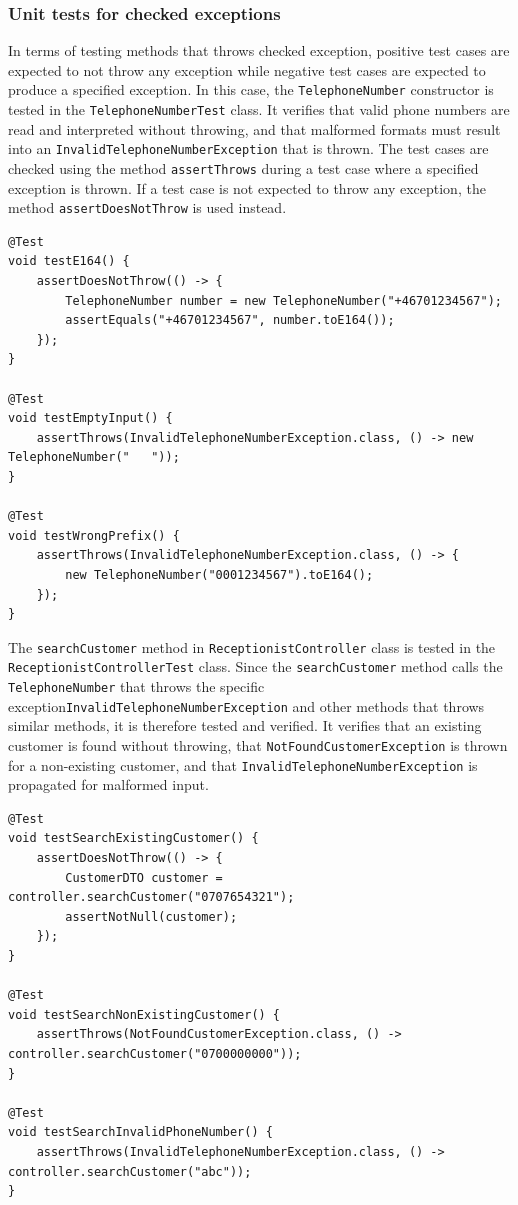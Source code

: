 \documentclass[a4paper]{scrartcl}
\begin{document}
\subsubsection{Unit tests for checked exceptions}

In terms of testing methods that throws checked exception, positive test cases are expected to not throw any exception while negative test cases are expected to produce a specified exception. In this case, the \texttt{TelephoneNumber} constructor is tested in the \texttt{TelephoneNumberTest} class. It verifies that valid phone numbers are read and interpreted without throwing, and that malformed formats must result into an \texttt{InvalidTelephoneNumberException} that is thrown. The test cases are checked using the method \texttt{assertThrows} during a test case where a specified exception is thrown. If a test case is not expected to throw any exception, the method \texttt{assertDoesNotThrow} is used instead.

\begin{lstlisting}[style=javastyle, caption={TelephoneNumberTest - testing TelephoneNumber constructor}]
@Test
void testE164() {
    assertDoesNotThrow(() -> {
        TelephoneNumber number = new TelephoneNumber("+46701234567");
        assertEquals("+46701234567", number.toE164());
    });
}

@Test
void testEmptyInput() {
    assertThrows(InvalidTelephoneNumberException.class, () -> new TelephoneNumber("   "));
}

@Test
void testWrongPrefix() {
    assertThrows(InvalidTelephoneNumberException.class, () -> {
        new TelephoneNumber("0001234567").toE164();
    });
}
\end{lstlisting}

The \texttt{searchCustomer} method in \texttt{ReceptionistController} class is tested in the \linebreak\texttt{ReceptionistControllerTest} class. Since the \texttt{searchCustomer} method calls the \linebreak\texttt{TelephoneNumber} that throws the specific exception\texttt{InvalidTelephoneNumberException} and other methods that throws similar methods, it is therefore tested and verified. It verifies that an existing customer is found without throwing, that \texttt{NotFoundCustomerException} is thrown for a non-existing customer, and that \texttt{InvalidTelephoneNumberException} is propagated for malformed input.

\begin{lstlisting}[style=javastyle, caption={ReceptionistControllerTest - testing searchCustomer method test in ReceptionistController class}]
@Test
void testSearchExistingCustomer() {
    assertDoesNotThrow(() -> {
        CustomerDTO customer = controller.searchCustomer("0707654321");
        assertNotNull(customer);
    });
}

@Test
void testSearchNonExistingCustomer() {
    assertThrows(NotFoundCustomerException.class, () -> controller.searchCustomer("0700000000"));
}

@Test
void testSearchInvalidPhoneNumber() {
    assertThrows(InvalidTelephoneNumberException.class, () -> controller.searchCustomer("abc"));
}
\end{lstlisting}
\end{document}

